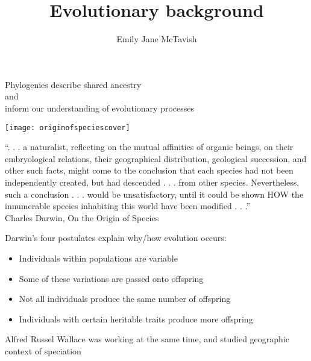 \documentclass{beamer}
\title[*]{Evolutionary background}
\author[*]{Emily Jane McTavish}
\institute[*]{
Life and Environmental Sciences\\
University of California, Merced\\
\texttt{ejmctavish@ucmerced.edu, twitter:snacktavish}\\
}
\date{}
\begin{document}
\begin{frame}
\titlepage
\end{frame}



\begin{frame}
\begin{center}
 \Large{Phylogenies describe shared ancestry\\
and\\
inform our understanding of evolutionary processes}
\end{center}
\end{frame}


\begin{frame}
\begin{center}
\centerline{\texttt{[image: originofspeciescover]}}
\end{center}
\end{frame}

\begin{frame}
``. . . a naturalist, reflecting on the mutual affinities of organic beings, on their embryological relations, 
their geographical distribution, geological succession, and other such facts, might come to the conclusion that each species had not been independently created, but had descended . . . from other species.
Nevertheless, such a conclusion . . . would be unsatisfactory, until it could be shown HOW the innumerable species inhabiting this world have been modified . . .''\\
Charles Darwin, On the Origin of Species
\end{frame}


\begin{frame}
Darwin’s four postulates explain why/how evolution occurs:
\begin{itemize}
 \item Individuals within populations are variable
 \item Some of these variations are passed onto offspring
 \item Not all individuals produce the same number of offspring
 \item Individuals with certain heritable traits produce more offspring
\end{itemize}
\end{frame}

\begin{frame}
Alfred Russel Wallace was working at the same time, and studied geographic context of speciation
\end{frame}
\end{document}
